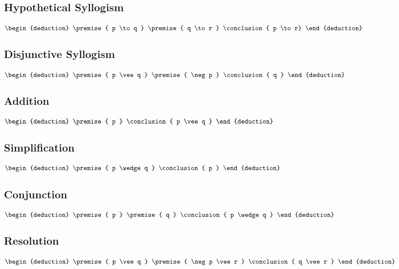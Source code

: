 \documentclass[12pt letter]{report}
\begin{document}
\subsection{Hypothetical Syllogism}

\begin{math}
	\begin{deduction}
		\premise{ p \to q }
		\premise{ q \to r }
		\conclusion{ p \to  r}
	\end{deduction}
\end{math}


\subsection{Disjunctive Syllogism}
\begin{math}
	\begin{deduction}
		\premise{ p \vee q }
		\premise{ \neg  p }
		\conclusion{ q }
	\end{deduction}
\end{math}

\subsection{Addition}
\begin{math}
	\begin{deduction}
		\premise{ p }
		\conclusion{ p \vee  q }
	\end{deduction}
\end{math}

\subsection{Simplification}
\begin{math}
	\begin{deduction}
		\premise{ p \wedge q }
		\conclusion{ p }
	\end{deduction}
\end{math}

\subsection{Conjunction}
\begin{math}
	\begin{deduction}
		\premise{ p }
		\premise{ q }
		\conclusion{ p \wedge q }
	\end{deduction}
\end{math}

\subsection{Resolution}
\begin{math}
	\begin{deduction}
		\premise{ p \vee q }
		\premise{ \neg p \vee r }
		\conclusion{ q \vee r }
	\end{deduction}
\end{math}
\end{document}
